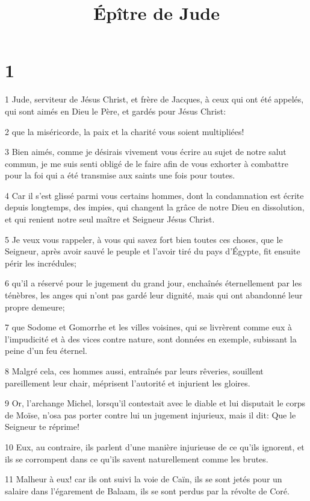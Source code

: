 

\title{Épître de Jude}


\chapter{1}

\par 1 Jude, serviteur de Jésus Christ, et frère de Jacques, à ceux qui ont été appelés, qui sont aimés en Dieu le Père, et gardés pour Jésus Christ:
\par 2 que la miséricorde, la paix et la charité vous soient multipliées!
\par 3 Bien aimés, comme je désirais vivement vous écrire au sujet de notre salut commun, je me suis senti obligé de le faire afin de vous exhorter à combattre pour la foi qui a été transmise aux saints une fois pour toutes.
\par 4 Car il s'est glissé parmi vous certains hommes, dont la condamnation est écrite depuis longtemps, des impies, qui changent la grâce de notre Dieu en dissolution, et qui renient notre seul maître et Seigneur Jésus Christ.
\par 5 Je veux vous rappeler, à vous qui savez fort bien toutes ces choses, que le Seigneur, après avoir sauvé le peuple et l'avoir tiré du pays d'Égypte, fit ensuite périr les incrédules;
\par 6 qu'il a réservé pour le jugement du grand jour, enchaînés éternellement par les ténèbres, les anges qui n'ont pas gardé leur dignité, mais qui ont abandonné leur propre demeure;
\par 7 que Sodome et Gomorrhe et les villes voisines, qui se livrèrent comme eux à l'impudicité et à des vices contre nature, sont données en exemple, subissant la peine d'un feu éternel.
\par 8 Malgré cela, ces hommes aussi, entraînés par leurs rêveries, souillent pareillement leur chair, méprisent l'autorité et injurient les gloires.
\par 9 Or, l'archange Michel, lorsqu'il contestait avec le diable et lui disputait le corps de Moïse, n'osa pas porter contre lui un jugement injurieux, mais il dit: Que le Seigneur te réprime!
\par 10 Eux, au contraire, ils parlent d'une manière injurieuse de ce qu'ils ignorent, et ils se corrompent dans ce qu'ils savent naturellement comme les brutes.
\par 11 Malheur à eux! car ils ont suivi la voie de Caïn, ils se sont jetés pour un salaire dans l'égarement de Balaam, ils se sont perdus par la révolte de Coré.
